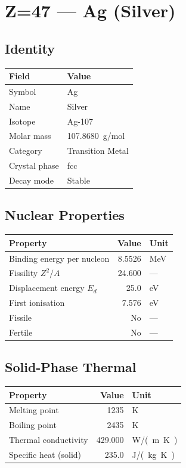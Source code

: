 \documentclass[11pt,a4paper]{article}
\begin{document}
\newpage

\section{Z=47 --- Ag (Silver)}
\label{sec:Z47}

\subsection{Identity}
\begin{tabular}{ll}
  \toprule
  Field & Value \\
  \midrule
  Symbol & Ag \\
  Name & Silver \\
  Isotope & Ag-107 \\
  Molar mass & \SI{107.8680}{g/mol} \\
  Category & Transition Metal \\
  Crystal phase & fcc \\
  Decay mode & Stable \\
  \bottomrule
\end{tabular}

\subsection{Nuclear Properties}
\begin{tabular}{lrl}
  \toprule
  Property & Value & Unit \\
  \midrule
  Binding energy per nucleon & 8.5526 & \si{MeV} \\
  Fissility $Z^2/A$ & 24.600 & --- \\
  Displacement energy $E_d$ & 25.0 & \si{eV} \\
  First ionisation & 7.576 & \si{eV} \\
  Fissile & No & --- \\
  Fertile & No & --- \\
  \bottomrule
\end{tabular}

\subsection{Solid-Phase Thermal}
\begin{tabular}{lrl}
  \toprule
  Property & Value & Unit \\
  \midrule
  Melting point & 1235 & \si{K} \\
  Boiling point & 2435 & \si{K} \\
  Thermal conductivity & 429.000 & \si{W/(m.K)} \\
  Specific heat (solid) & 235.0 & \si{J/(kg.K)} \\
  \bottomrule
\end{tabular}
\end{document}
